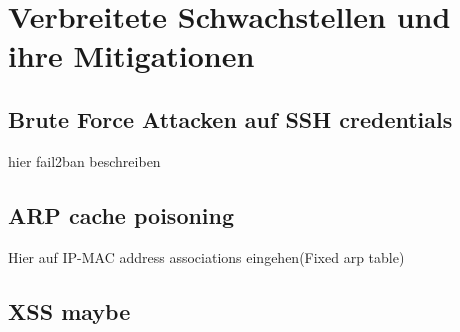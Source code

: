 
\section{Verbreitete Schwachstellen und ihre Mitigationen}\label{sec:bekannte-schwachstellen-und-ihre-mitegationen}

\subsection{Brute Force Attacken auf SSH credentials}\label{subsec:fail2ban}
hier fail2ban beschreiben
\subsection{ARP cache poisoning}\label{subsec:arp-chache-poisoning}
Hier auf IP-MAC address associations eingehen(Fixed arp table)
\subsection{XSS maybe}